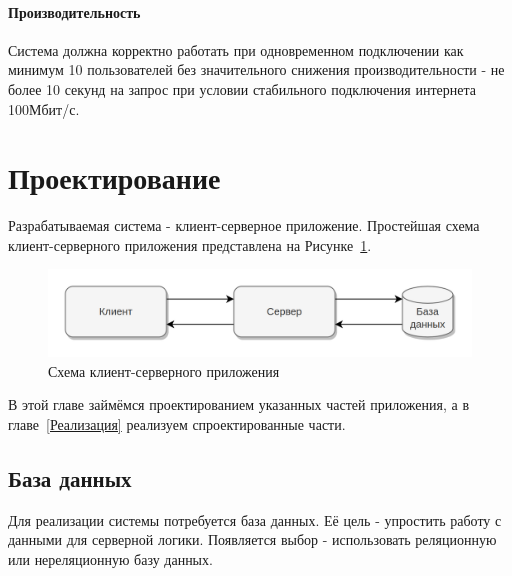 \documentclass[a4paper,article]{article}
\begin{document}
    \paragraph{Производительность}\label{ТЗ. Производительность}

    Система должна корректно работать при одновременном подключении как минимум 10 пользователей без значительного снижения производительности - не более 10 секунд на запрос при условии стабильного подключения интернета 100Мбит/с.

    \pagestyle{plain}

    \newpage

    \section{Проектирование}\label{Проектирование}

    Разрабатываемая система - клиент-серверное приложение. Простейшая схема клиент-серверного приложения представлена на Рисунке~\ref{fig:Схема клиент-серверного приложения}.

    \begin{figure}[h]

        \centering

        \includegraphics[width=0.8\linewidth]{Схема клиент-серверного приложения.png}

        \caption{\centering Схема клиент-серверного приложения}

        \label{fig:Схема клиент-серверного приложения}

    \end{figure}

    В этой главе займёмся проектированием указанных частей приложения, а в главе~\ref{Реализация} реализуем спроектированные части.

    \subsection{База данных}

    Для реализации системы потребуется база данных. Её цель - упростить работу с данными для серверной логики. Появляется выбор - использовать реляционную или нереляционную базу данных.
\end{document}
